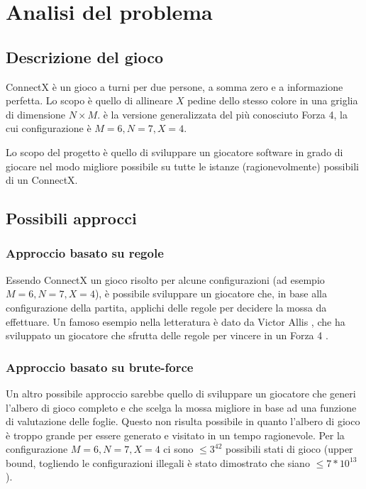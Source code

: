 \chapter{Analisi del problema}

\section{Descrizione del gioco}

ConnectX è un gioco a turni per due persone, a somma zero e a informazione perfetta. Lo scopo è quello di allineare $X$ pedine dello stesso colore in una griglia di dimensione $N \times M$. è la versione generalizzata del più conosciuto Forza 4, la cui configurazione è $M=6, N=7, X=4$.

Lo scopo del progetto è quello di sviluppare un giocatore software in
grado di giocare nel modo migliore possibile su tutte le istanze (ragionevolmente) possibili di un ConnectX.

\section{Possibili approcci}

\subsection{Approccio basato su regole}

Essendo ConnectX un gioco risolto per alcune configurazioni (ad esempio $M=6, N=7, X=4$), è possibile sviluppare un giocatore che, in base alla configurazione della partita, applichi delle regole per decidere la mossa da effettuare.
Un famoso esempio nella letteratura è dato da Victor Allis , che ha sviluppato un giocatore che sfrutta delle regole per vincere in un Forza 4 \cite{VICTOR}.

\subsection{Approccio basato su brute-force}

Un altro possibile approccio sarebbe quello di sviluppare un giocatore che generi l'albero di gioco completo e che scelga la mossa migliore in base ad una funzione di valutazione delle foglie.
Questo non risulta possibile in quanto l'albero di gioco è troppo grande per essere generato e visitato in un tempo ragionevole. Per la configurazione $M=6, N=7, X=4$ ci sono $\leq 3^{42}$ possibili stati di gioco (upper bound, togliendo le configurazioni illegali è stato dimostrato che siano $\leq 7*10^{13}$ \cite{VICTOR}).

